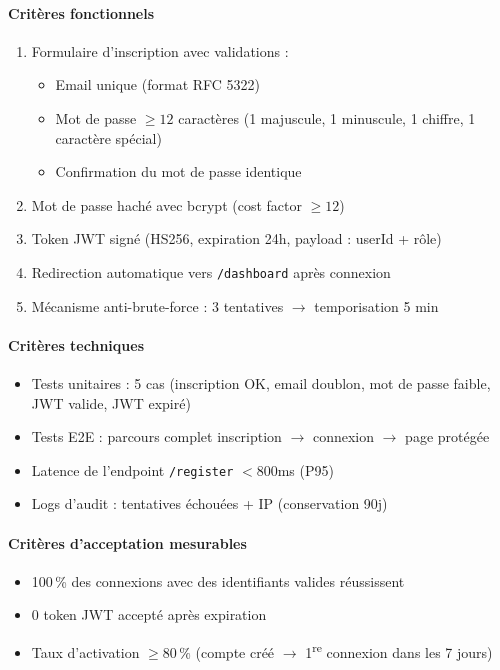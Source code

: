 \paragraph{Critères fonctionnels}
\begin{enumerate}
  \item Formulaire d'inscription avec validations :
    \begin{itemize}
      \item Email unique (format RFC 5322)
      \item Mot de passe $\geq 12$ caractères (1 majuscule, 1 minuscule, 1 chiffre, 1 caractère spécial)
      \item Confirmation du mot de passe identique
    \end{itemize}
  \item Mot de passe haché avec bcrypt (cost factor $\geq 12$)
  \item Token JWT signé (HS256, expiration 24h, payload : userId + rôle)
  \item Redirection automatique vers \texttt{/dashboard} après connexion
  \item Mécanisme anti-brute-force : 3 tentatives $\rightarrow$ temporisation 5 min
\end{enumerate}

\paragraph{Critères techniques}
\begin{itemize}
  \item Tests unitaires : 5 cas (inscription OK, email doublon, mot de passe faible, JWT valide, JWT expiré)
  \item Tests E2E : parcours complet inscription $\rightarrow$ connexion $\rightarrow$ page protégée
  \item Latence de l'endpoint \texttt{/register} $< 800$ms (P95)
  \item Logs d'audit : tentatives échouées + IP (conservation 90j)
\end{itemize}

\paragraph{Critères d'acceptation mesurables}
\begin{itemize}
  \item[$\checkmark$] 100\,\% des connexions avec des identifiants valides réussissent
  \item[$\checkmark$] 0 token JWT accepté après expiration
  \item[$\checkmark$] Taux d'activation $\geq 80\,\%$ (compte créé $\rightarrow$ 1\textsuperscript{re} connexion dans les 7 jours)
\end{itemize}

